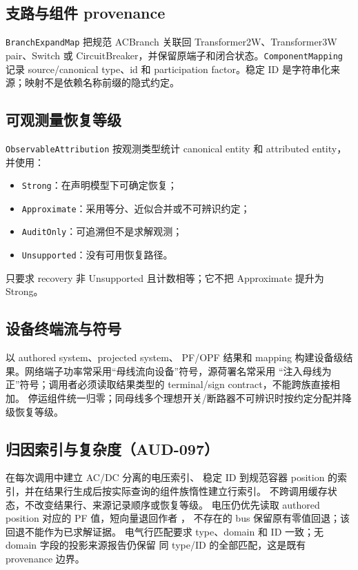 \subsection{支路与组件 provenance}

\texttt{BranchExpandMap} 把规范 ACBranch 关联回 Transformer2W、Transformer3W pair、Switch 或
CircuitBreaker，并保留原端子和闭合状态。\texttt{ComponentMapping} 记录 source/canonical type、id 和
participation factor。稳定 ID 是字符串化来源；映射不是依赖名称前缀的隐式约定。

\subsection{可观测量恢复等级}

\texttt{ObservableAttribution} 按观测类型统计 canonical entity 和 attributed entity，并使用：
\begin{itemize}
  \item \texttt{Strong}：在声明模型下可确定恢复；
  \item \texttt{Approximate}：采用等分、近似合并或不可辨识约定；
  \item \texttt{AuditOnly}：可追溯但不是求解观测；
  \item \texttt{Unsupported}：没有可用恢复路径。
\end{itemize}
 只要求 recovery 非 Unsupported 且计数相等；它不把 Approximate 提升为 Strong。

\subsection{设备终端流与符号}

 以 authored system、projected system、
PF/OPF 结果和 mapping 构建设备级结果。网络端子功率常采用“母线流向设备”符号，源荷署名常采用
“注入母线为正”符号；调用者必须读取结果类型的 terminal/sign contract，不能跨族直接相加。
停运组件统一归零；同母线多个理想开关/断路器不可辨识时按约定分配并降级恢复等级。

\subsection{归因索引与复杂度（AUD-097）}

 在每次调用中建立 AC/DC 分离的电压索引、
稳定 ID 到规范容器 position 的索引，并在结果行生成后按实际查询的组件族惰性建立行索引。
不跨调用缓存状态，不改变结果行、来源记录顺序或恢复等级。
电压仍优先读取 authored position 对应的 PF 值，短向量退回作者 ，
不存在的 bus 保留原有零值回退；该回退不能作为已求解证据。
电气行匹配要求 type、domain 和 ID 一致；无 domain 字段的投影来源报告仍保留
同 type/ID 的全部匹配，这是既有 provenance 边界。

